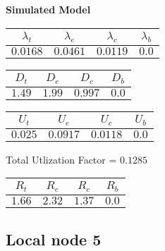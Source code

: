 \documentclass{article}
\begin{document}
\begin{minipage}{0.5\textwidth}
\centering	\textbf{Simulated Model}
\begin{table}[H]
\centering
\begin{tabular}{@{}cccc@{}}
\toprule
$\lambda_t$ & $\lambda_e$ & $\lambda_c$ & $\lambda_b$\\
\midrule
$0.0168$ & $0.0461$ & $0.0119$ & $0.0$\\
\bottomrule
\end{tabular}
\end{table}
\begin{table}[H]
\centering
\begin{tabular}{@{}cccc@{}}
\toprule
$D_t$ & $D_e$ & $D_c$ & $D_b$\\
\midrule
$1.49$ & $1.99$ & $0.997$ & $0.0$\\
\bottomrule
\end{tabular}
\end{table}\begin{table}[H]
\centering
\begin{tabular}{@{}cccc@{}}
\toprule
$U_t$ & $U_e$ & $U_c$ & $U_b$\\
\midrule
$0.025$ & $0.0917$ & $0.0118$ & $0.0$\\
\bottomrule
\end{tabular}
\end{table}
\centering Total Utlization Factor = $0.1285$
\begin{table}[H]
\centering
\begin{tabular}{@{}cccc@{}}
\toprule
$R_t$ & $R_e$ & $R_c$ & $R_b$\\
\midrule
$1.66$ & $2.32$ & $1.37$ & $0.0$\\
\bottomrule
\end{tabular}
\end{table}
\end{minipage}\subsection{Local node 5}
\end{document}
